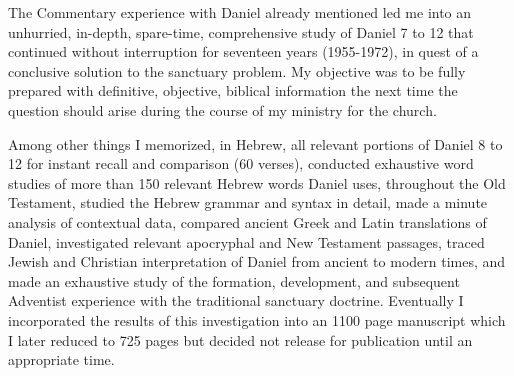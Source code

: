 The Commentary experience with Daniel already mentioned led me into an
unhurried, in-depth, spare-time, comprehensive study of Daniel 7 to 12
that continued without interruption for seventeen years (1955-1972), in
quest of a conclusive solution to the sanctuary problem. My objective was to
be fully prepared with definitive, objective, biblical information the next
time the question should arise during the course of my ministry for the
church.

Among other things I memorized, in Hebrew, all relevant portions of Daniel 8
to 12 for instant recall and comparison (60 verses), conducted exhaustive
word studies
of more than 150 relevant Hebrew words Daniel uses,
throughout the Old Testament, studied the Hebrew grammar and syntax in
detail, made a minute analysis of contextual data, compared ancient Greek
and Latin translations of Daniel, investigated relevant apocryphal and New
Testament passages, traced Jewish and Christian
interpretation of Daniel
from ancient to modern times,
and made an exhaustive study of the
formation, development, and subsequent Adventist experience with the
traditional sanctuary doctrine.
Eventually I incorporated the results of
this investigation into an 1100 page manuscript which I later reduced to 725
pages but decided not release for publication until an appropriate time.

